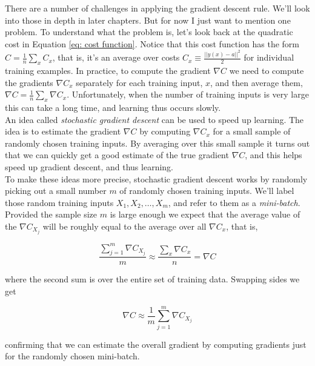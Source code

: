 There are a number of challenges in applying the gradient descent rule. We'll look into those in depth in later chapters. But for now I just want to mention one problem. To understand what the problem is, let's look back at the quadratic cost in Equation \ref{eq: cost function}. Notice that this cost function has the form $C=\frac{1}{n}\sum_x C_x$, that is, it's an average over costs $C_x\equiv \frac{||y(x)-a||^2}{2}$ for individual training examples. In practice, to compute the gradient $\nabla C$ we need to compute the gradients $\nabla C_x$ separately for each training input, $x$, and then average them, $\nabla C=\frac{1}{n}\sum_x \nabla C_x$. Unfortunately, when the number of training inputs is very large this can take a long time, and learning thus occurs slowly.\\

An idea called \textit{stochastic gradient descent} can be used to speed up learning. The idea is to estimate the gradient $\nabla C$ by computing $\nabla C_x$ for a small sample of randomly chosen training inputs. By averaging over this small sample it turns out that we can quickly get a good estimate of the true gradient $\nabla C$, and this helps speed up gradient descent, and thus learning.\\

To make these ideas more precise, stochastic gradient descent works by randomly picking out a small number $m$ of randomly chosen training inputs. We'll label those random training inputs $X_1,X_2,…,X_m$, and refer to them as a \textit{mini-batch}. Provided the sample size $m$ is large enough we expect that the average value of the $\nabla C_{X_j}$ will be roughly equal to the average over all $\nabla C_x$, that is,

\begin{equation}
\frac{\sum_{j=1}^m \nabla C_{X_j}}{m}\approx\frac{\sum_x \nabla C_x}{n}=\nabla C
\label{eq: grad of C on mini-batch}
\end{equation}

where the second sum is over the entire set of training data. Swapping sides we get

\begin{equation}
\nabla C\approx\frac{1}{m}\sum_{j=1}^m \nabla C_{X_j}
\label{eq: approx of grad of C on mini-batch}
\end{equation}

confirming that we can estimate the overall gradient by computing gradients just for the randomly chosen mini-batch.\\

